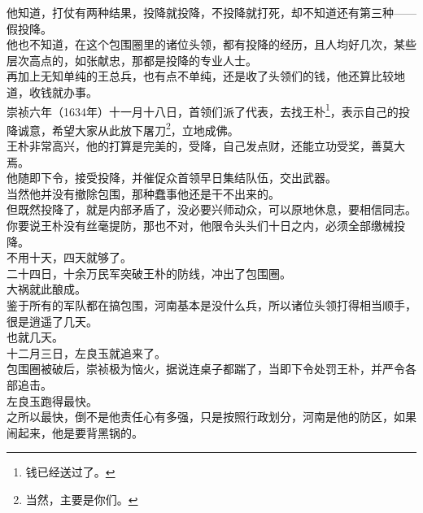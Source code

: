 \begin{multicols}{\theparacolNo}
他知道，打仗有两种结果，投降就投降，不投降就打死，却不知道还有第三种——假投降。\\

他也不知道，在这个包围圈里的诸位头领，都有投降的经历，且人均好几次，某些层次高点的，如张献忠，那都是投降的专业人士。\\

再加上无知单纯的王总兵，也有点不单纯，还是收了头领们的钱，他还算比较地道，收钱就办事。\\

崇祯六年（1634年）十一月十八日，首领们派了代表，去找王朴\footnote{钱已经送过了。}，表示自己的投降诚意，希望大家从此放下屠刀\footnote{当然，主要是你们。}，立地成佛。\\

王朴非常高兴，他的打算是完美的，受降，自己发点财，还能立功受奖，善莫大焉。\\

他随即下令，接受投降，并催促众首领早日集结队伍，交出武器。\\

当然他并没有撤除包围，那种蠢事他还是干不出来的。\\

但既然投降了，就是内部矛盾了，没必要兴师动众，可以原地休息，要相信同志。\\

你要说王朴没有丝毫提防，那也不对，他限令头头们十日之内，必须全部缴械投降。\\

不用十天，四天就够了。\\

二十四日，十余万民军突破王朴的防线，冲出了包围圈。\\

大祸就此酿成。\\

鉴于所有的军队都在搞包围，河南基本是没什么兵，所以诸位头领打得相当顺手，很是逍遥了几天。\\

也就几天。\\

十二月三日，左良玉就追来了。\\

包围圈被破后，崇祯极为恼火，据说连桌子都踹了，当即下令处罚王朴，并严令各部追击。\\

左良玉跑得最快。\\

之所以最快，倒不是他责任心有多强，只是按照行政划分，河南是他的防区，如果闹起来，他是要背黑锅的。\\


\end{multicols}
